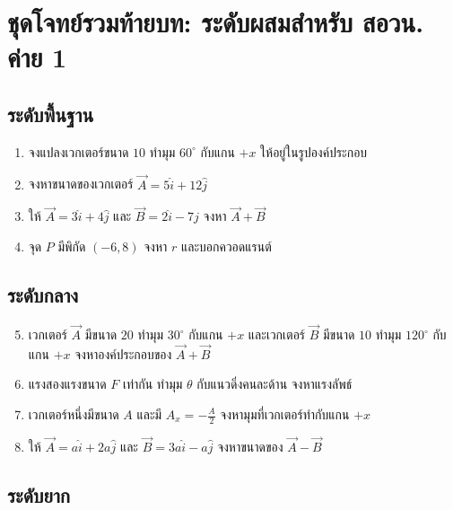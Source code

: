 \documentclass[12pt,a4paper]{report}
\begin{document}
\section{ชุดโจทย์รวมท้ายบท: ระดับผสมสำหรับ สอวน. ค่าย 1}

\subsection*{ระดับพื้นฐาน}

\begin{enumerate}
    \item จงแปลงเวกเตอร์ขนาด $10$ ทำมุม $60^\circ$ กับแกน $+x$ ให้อยู่ในรูปองค์ประกอบ
    \item จงหาขนาดของเวกเตอร์ $\vec{A}=5\hat{i}+12\hat{j}$
    \item ให้ $\vec{A}=3\hat{i}+4\hat{j}$ และ $\vec{B}=2\hat{i}-7\hat{j}$ จงหา $\vec{A}+\vec{B}$
    \item จุด $P$ มีพิกัด $(-6,8)$ จงหา $r$ และบอกควอดแรนต์
\end{enumerate}

\subsection*{ระดับกลาง}

\begin{enumerate}
    \setcounter{enumi}{4}
    \item เวกเตอร์ $\vec{A}$ มีขนาด $20$ ทำมุม $30^\circ$ กับแกน $+x$ และเวกเตอร์ $\vec{B}$ มีขนาด $10$ ทำมุม $120^\circ$ กับแกน $+x$ จงหาองค์ประกอบของ $\vec{A}+\vec{B}$
    \item แรงสองแรงขนาด $F$ เท่ากัน ทำมุม $\theta$ กับแนวดิ่งคนละด้าน จงหาแรงลัพธ์
    \item เวกเตอร์หนึ่งมีขนาด $A$ และมี $A_x=-\frac{A}{2}$ จงหามุมที่เวกเตอร์ทำกับแกน $+x$
    \item ให้ $\vec{A}=a\hat{i}+2a\hat{j}$ และ $\vec{B}=3a\hat{i}-a\hat{j}$ จงหาขนาดของ $\vec{A}-\vec{B}$
\end{enumerate}

\subsection*{ระดับยาก}
\end{document}

